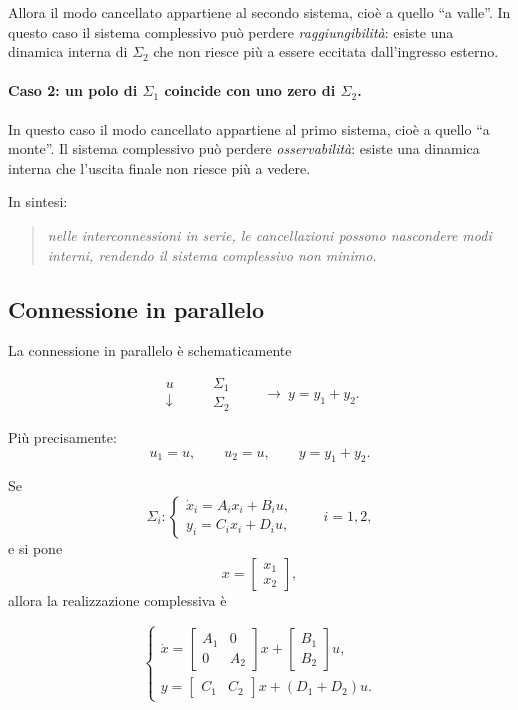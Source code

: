 Allora il modo cancellato appartiene al secondo sistema, cioè a quello ``a valle''. In questo caso il sistema complessivo può perdere \emph{raggiungibilità}: esiste una dinamica interna di \(\Sigma_2\) che non riesce più a essere eccitata dall'ingresso esterno.

\paragraph{Caso 2: un polo di \(\Sigma_1\) coincide con uno zero di \(\Sigma_2\).}

In questo caso il modo cancellato appartiene al primo sistema, cioè a quello ``a monte''. Il sistema complessivo può perdere \emph{osservabilità}: esiste una dinamica interna che l'uscita finale non riesce più a vedere.

\medskip

In sintesi:
\begin{quote}
\emph{nelle interconnessioni in serie, le cancellazioni possono nascondere modi interni, rendendo il sistema complessivo non minimo.}
\end{quote}

\bigskip

\subsection{Connessione in parallelo}

La connessione in parallelo è schematicamente

\[
\begin{array}{c}
u \\
\downarrow
\end{array}
\qquad
\begin{array}{c}
\boxed{\Sigma_1}\\[0.4em]
\boxed{\Sigma_2}
\end{array}
\qquad
\longrightarrow\ y=y_1+y_2.
\]

Più precisamente:
\[
u_1=u,\qquad u_2=u,\qquad y=y_1+y_2.
\]

Se
\[
\Sigma_i:
\begin{cases}
\dot x_i=A_ix_i+B_iu,\\
y_i=C_ix_i+D_iu,
\end{cases}
\qquad i=1,2,
\]
e si pone
\[
x=\begin{bmatrix}x_1\\x_2\end{bmatrix},
\]
allora la realizzazione complessiva è

\[
\begin{cases}
\dot x=
\begin{bmatrix}
A_1 & 0\\
0 & A_2
\end{bmatrix}x+
\begin{bmatrix}
B_1\\
B_2
\end{bmatrix}u,\\[1.2em]
y=
\begin{bmatrix}
C_1 & C_2
\end{bmatrix}x+(D_1+D_2)u.
\end{cases}
\]

